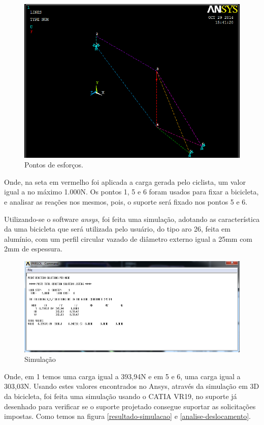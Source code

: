 \begin{figure}[h]
\centering
\includegraphics[scale=0.5]{figuras/3D_bike.png}
\caption{Pontos de esforços.}
\label{pontos-esforcos}
\end{figure}

Onde, na seta em vermelho foi aplicada a carga gerada pelo ciclista, um valor igual a no máximo 1.000N. Os pontos 1, 5 e 6 foram usados para fixar a bicicleta, e analisar as reações nos mesmos, pois, o suporte será fixado nos pontos 5 e 6.

Utilizando-se o software \textit{ansys}, foi feita uma simulação, adotando as característica da uma bicicleta que será utilizada pelo usuário, do tipo aro 26, feita em alumínio, com um perfil circular vazado de diâmetro externo igual a 25mm com 2mm de espessura.

\begin{figure}[h]
\centering
\includegraphics[scale=0.5]{figuras/reacoes.png}
\caption{Simulação}
\end{figure}

Onde, em 1 temos uma carga igual a 393,94N e em 5 e 6, uma carga igual a 303,03N. Usando estes valores encontrados no Ansys, através da simulação em 3D da bicicleta, foi feita uma simulação usando o CATIA VR19, no suporte já desenhado para verificar se o suporte projetado consegue suportar as solicitações impostas. Como temos na figura \ref{resultado-simulacao} e \ref{analise-deslocamento}.

